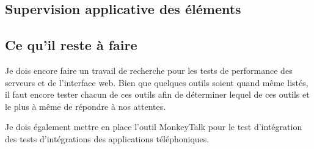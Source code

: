 \subsection{Supervision applicative des éléments}


\subsection{Ce qu'il reste à faire}

Je dois encore faire un travail de recherche pour les tests de performance des serveurs et de l'interface web. Bien que quelques outils soient quand même listés, il faut encore tester chacun de ces outils afin de déterminer lequel de ces outils et le plus à même de répondre à nos attentes.

Je dois également mettre en place l'outil MonkeyTalk pour le test d'intégration des tests d'intégrations des applications téléphoniques.